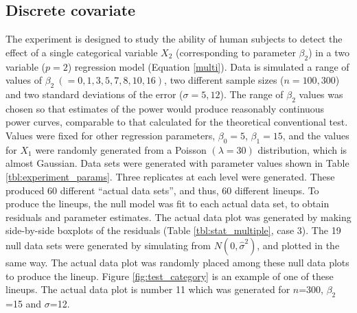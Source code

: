 \documentclass[12pt]{article}
\begin{document}
\subsection{Discrete covariate}\label{sec:category}

The experiment is designed to study the ability of human subjects to detect the effect of a single categorical variable $X_2$ (corresponding to parameter $\beta_2$) in a two variable ($p=2$) regression model (Equation \ref{multi}). Data is simulated a range of values of $\beta_2~ (=0, 1, 3, 5, 7, 8, 10, 16)$, two different sample sizes ($n=100, 300$) and two standard deviations of the error ($\sigma=5, 12$). The range of $\beta_2$ values was chosen so that estimates of the power would produce reasonably continuous power curves, comparable to that calculated for the theoretical conventional test. Values were fixed for other regression parameters, $\beta_0 = 5$,  $\beta_1=15$, and the values for $X_1$ were randomly generated from a Poisson $(\lambda=30)$ distribution, which is almost Gaussian. Data sets were generated with parameter values shown in Table \ref{tbl:experiment_params}. Three replicates at each level were generated. These produced 60 different ``actual data sets'', and thus, 60 different lineups. To produce the lineups, the null model was fit to each actual data set, to obtain residuals and parameter estimates. The actual data plot was generated by making  side-by-side boxplots of the residuals (Table \ref{tbl:stat_multiple}, case 3). The 19 null data sets were generated by simulating from  $N(0, {\hat{\sigma}}^2)$, and  plotted in the same way. The actual data plot was randomly placed among these null data plots to produce the lineup. Figure \ref{fig:test_category} is an example of one of these lineups. The actual data plot is number 11 which was generated for $n$=300, $\beta_2$=15 and $\sigma$=12.  

\end{document}
